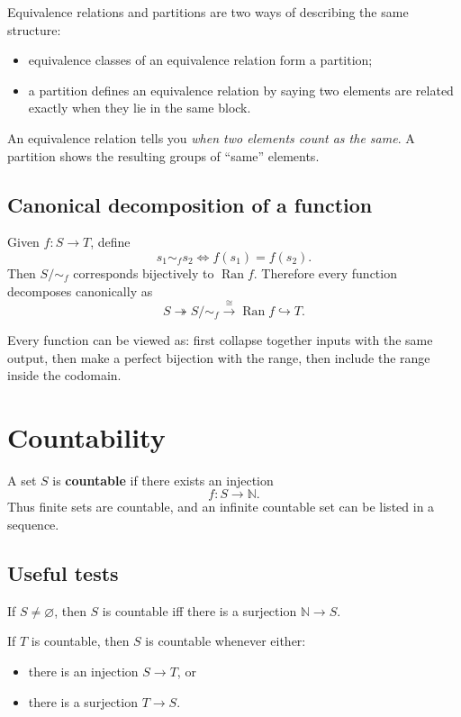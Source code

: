 \documentclass[11pt,a4paper]{article}
\newcommand{\N}{\mathbb{N}}
\newcommand{\Ran}{\operatorname{Ran}}
\begin{document}
\begin{theorembox}
Equivalence relations and partitions are two ways of describing the same structure:
\begin{itemize}
\item equivalence classes of an equivalence relation form a partition;
\item a partition defines an equivalence relation by saying two elements are related exactly when they lie in the same block.
\end{itemize}
\end{theorembox}

\begin{keybox}
An equivalence relation tells you \emph{when two elements count as the same}. A partition shows the resulting groups of ``same'' elements.
\end{keybox}

\subsection{Canonical decomposition of a function}
Given $f:S\to T$, define
\[
s_1\sim_f s_2 \iff f(s_1)=f(s_2).
\]
Then $S/\!\sim_f$ corresponds bijectively to $\Ran f$. Therefore every function decomposes canonically as
\[
S\twoheadrightarrow S/\!\sim_f\xrightarrow{\cong}\Ran f\hookrightarrow T.
\]

\begin{keybox}
Every function can be viewed as: first collapse together inputs with the same output, then make a perfect bijection with the range, then include the range inside the codomain.
\end{keybox}

\section{Countability}

\begin{defbox}
A set $S$ is \textbf{countable} if there exists an injection
\[
f:S\to\N.
\]
Thus finite sets are countable, and an infinite countable set can be listed in a sequence.
\end{defbox}

\subsection{Useful tests}
If $S\neq\varnothing$, then $S$ is countable iff there is a surjection $\N\to S$.

If $T$ is countable, then $S$ is countable whenever either:
\begin{itemize}
\item there is an injection $S\to T$, or
\item there is a surjection $T\to S$.
\end{itemize}
\end{document}
